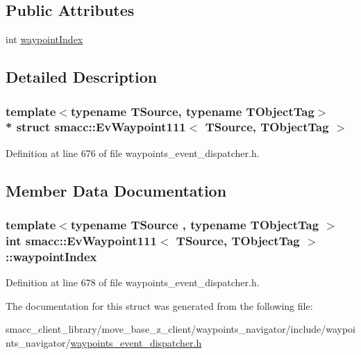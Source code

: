 \subsection*{Public Attributes}
\begin{DoxyCompactItemize}
\item 
int \hyperlink{structsmacc_1_1EvWaypoint111_ac5954bba09eddccfea5ca7ff82e7c3c8}{waypoint\+Index}
\end{DoxyCompactItemize}


\subsection{Detailed Description}
\subsubsection*{template$<$typename T\+Source, typename T\+Object\+Tag$>$\\*
struct smacc\+::\+Ev\+Waypoint111$<$ T\+Source, T\+Object\+Tag $>$}



Definition at line 676 of file waypoints\+\_\+event\+\_\+dispatcher.\+h.



\subsection{Member Data Documentation}
\subsubsection[{\texorpdfstring{waypoint\+Index}{waypointIndex}}]{\setlength{\rightskip}{0pt plus 5cm}template$<$typename T\+Source , typename T\+Object\+Tag $>$ int {\bf smacc\+::\+Ev\+Waypoint111}$<$ T\+Source, T\+Object\+Tag $>$\+::waypoint\+Index}\hypertarget{structsmacc_1_1EvWaypoint111_ac5954bba09eddccfea5ca7ff82e7c3c8}{}\label{structsmacc_1_1EvWaypoint111_ac5954bba09eddccfea5ca7ff82e7c3c8}


Definition at line 678 of file waypoints\+\_\+event\+\_\+dispatcher.\+h.



The documentation for this struct was generated from the following file\+:\begin{DoxyCompactItemize}
\item 
smacc\+\_\+client\+\_\+library/move\+\_\+base\+\_\+z\+\_\+client/waypoints\+\_\+navigator/include/waypoints\+\_\+navigator/\hyperlink{waypoints__event__dispatcher_8h}{waypoints\+\_\+event\+\_\+dispatcher.\+h}\end{DoxyCompactItemize}
